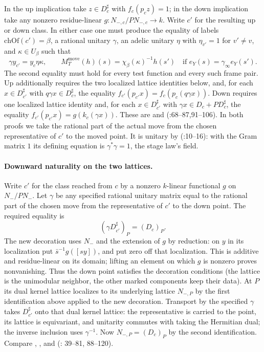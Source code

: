 In the up implication take $z\in D_c^\sharp$ with $f_c(p_c z)=1$;
in the down implication take any nonzero residue-linear
$g:N_{-,c}/PN_{-,c}\to k$. Write $c'$ for the resulting up or down
class. In either case one must produce the equality of labels
$\mathrm{chOf}(c')=\beta$, a rational unitary $\gamma$, an adelic
unitary $\eta$ with $\eta_{v'}=1$ for $v'\ne v$, and
$\kappa\in U_\beta$ such that
\[
   \gamma y_{c'}=y_c\eta\kappa,\qquad
   M^{\mathrm{move}}_T(h)(s)=\chi_\beta(\kappa)^{-1}h(s')
   \quad\text{if } e_Y(s)=\gamma_\infty e_Y(s').
\]
The second equality must hold for every test function and every such
frame pair.  Up additionally requires the two localized lattice
identities below, and, for each $x\in D_{c'}^\sharp$ with
$q\gamma x\in D_c^\sharp$, the equality
$f_{c'}(p_{c'}x)=f_c(p_c(q\gamma x))$. Down requires one localized
lattice identity and, for each $x\in D_{c'}^\sharp$ with
$\gamma x\in D_c+P D_c^\sharp$, the equality
$f_{c'}(p_{c'} x)=g(k_c(\gamma x))$.
These are  and 
(:68--87,91--106).
In both proofs we take the rational part of the actual move
from the chosen representative of $c'$ to the moved point. It is
unitary by  (:10--16):
with the Gram matrix $1$ its defining equation is
$\gamma^*\gamma=1$, the stage law's  field.

\paragraph{Downward naturality on the two lattices.}
Write $c'$ for the class reached from $c$ by a nonzero $k$-linear
functional $g$ on $N_-/PN_-$. Let $\gamma$ be any specified rational
unitary matrix equal to the rational part of the chosen move from the
representative of $c'$ to the down point. The required equality is
\[
 (\gamma D_{c'}^\sharp)_P=(D_c)_P .
\]
The new decoration uses $N_-$ and the extension of $g$ by reduction:
on $y$ in its localization put $\bar s^{-1}g([sy])$, and put zero
off that localization. This is additive and residue-linear on its domain;
lifting an element on which $g$ is nonzero proves nonvanishing. Thus the
down point satisfies the decoration conditions (the lattice is the
unimodular neighbor, the other marked components keep their data).
At $P$ its dual kernel lattice localizes to its underlying lattice
$N_{-,P}$ by the first identification above applied to the new
decoration. Transport by the specified $\gamma$ takes $D_{c'}^\sharp$
onto that dual kernel lattice: the representative is carried to the
point, its lattice is equivariant, and unitarity commutes with taking
the Hermitian dual; the inverse inclusion uses $\gamma^{-1}$.
Now $N_{-,P}=(D_c)_P$ by the second identification. Compare
, ,  and
 (:
39--81, 88--120).

